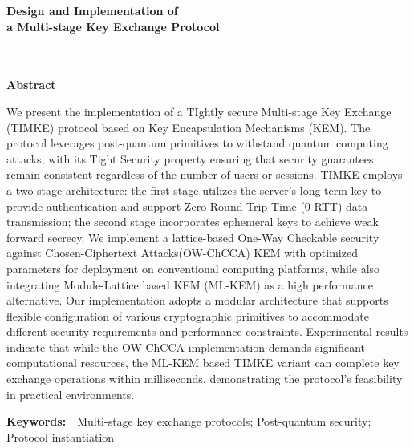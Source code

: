 \begin{center}
  {\bfseries Design and Implementation of
  \\ a Multi-stage Key Exchange Protocol}
  \\ \hspace*{\fill} 
  \\ \hspace*{\fill} \\
   \bfseries Abstract
\end{center}
  \bigskip
  \begin{spacing}{1.5}
  We present the implementation of a TIghtly secure Multi-stage Key Exchange (TIMKE) protocol based on Key Encapsulation Mechanisms (KEM). The protocol leverages post-quantum primitives to withstand quantum computing attacks, with its Tight Security property ensuring that security guarantees remain consistent regardless of the number of users or sessions. 
  TIMKE employs a two-stage architecture: the first stage utilizes the server's long-term key to provide authentication and support Zero Round Trip Time (0-RTT) data transmission; the second stage incorporates ephemeral keys to achieve weak forward secrecy. 
  We implement a lattice-based One-Way Checkable security against Chosen-Ciphertext Attacks(OW-ChCCA) KEM with optimized parameters for deployment on conventional computing platforms, while also integrating Module-Lattice based KEM (ML-KEM) as a high performance alternative. Our implementation adopts a modular architecture that supports flexible configuration of various cryptographic primitives to accommodate different security requirements and performance constraints. 
  Experimental results indicate that while the OW-ChCCA implementation demands significant computational resources, the ML-KEM based TIMKE variant can complete key exchange operations within milliseconds, demonstrating the protocol's feasibility in practical environments.
  \end{spacing}
  \medskip
  \textbf{Keywords:}\ \ Multi-stage key exchange protocols; Post-quantum security; Protocol instantiation
\newpage